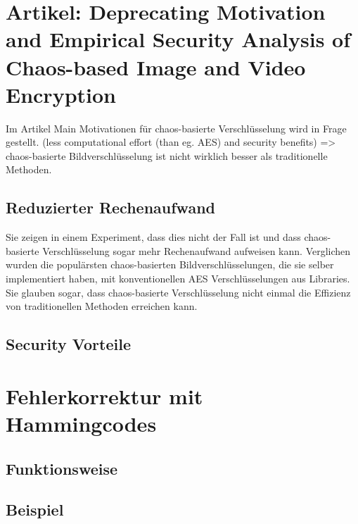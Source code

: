 \section{Artikel: Deprecating Motivation and Empirical Security Analysis of Chaos-based Image and Video Encryption}
Im Artikel \cite{chaos}
Main Motivationen für chaos-basierte Verschlüsselung wird in Frage gestellt. (less computational effort (than eg. AES) and security benefits)
=> chaos-basierte Bildverschlüsselung ist nicht wirklich besser als traditionelle Methoden.

\subsection{Reduzierter Rechenaufwand}
Sie zeigen in einem Experiment, dass dies nicht der Fall ist und dass chaos-basierte Verschlüsselung sogar
mehr Rechenaufwand aufweisen kann. Verglichen wurden die populärsten chaos-basierten Bildverschlüsselungen, die sie
selber implementiert haben, mit
konventionellen AES Verschlüsselungen aus Libraries. Sie glauben sogar, dass chaos-basierte Verschlüsselung nicht einmal die Effizienz von
traditionellen Methoden erreichen kann.

\subsection{Security Vorteile}



\section{Fehlerkorrektur mit Hammingcodes}
\subsection{Funktionsweise}
\subsection{Beispiel}




